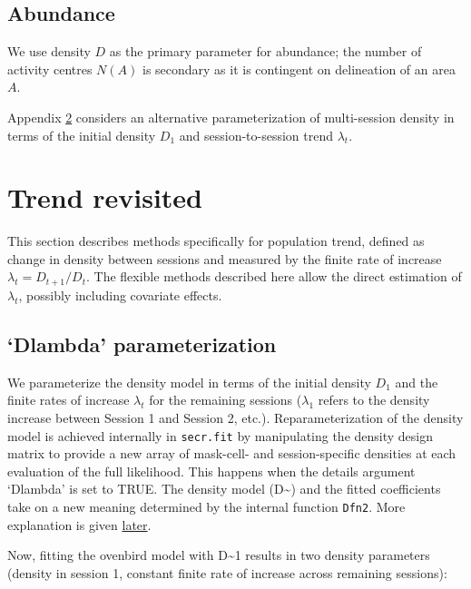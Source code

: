 \documentclass[
]{book}
\begin{document}
\section{Abundance}\label{abundance}

We use density \(D\) as the primary parameter for abundance; the number of activity centres \(N(A)\) is secondary as it is contingent on delineation of an area \(A\).

Appendix \ref{Trend} considers an alternative parameterization of multi-session density in terms of the initial density \(D_1\) and session-to-session trend \(\lambda_t\).

\chapter{Trend revisited}\label{Trend}

This section describes methods specifically for population trend, defined as change in density between sessions and measured by the finite rate of increase \(\lambda_t = D_{t+1} / D_t\). The flexible methods described here allow the direct estimation of \(\lambda_t\), possibly including covariate effects.

\section{`Dlambda' parameterization}\label{dlambda-parameterization}


We parameterize the density model in terms of the initial density \(D_1\) and the finite rates of increase \(\lambda_t\) for the remaining sessions (\(\lambda_1\) refers to the density increase between Session 1 and Session 2, etc.). Reparameterization of the density model is achieved internally in \texttt{secr.fit} by manipulating the density design matrix to provide a new array of mask-cell- and session-specific densities at each evaluation of the full likelihood. This happens when the details argument `Dlambda' is set to TRUE. The density model (D\textasciitilde) and the fitted coefficients take on a new meaning determined by the internal function \texttt{Dfn2}. More explanation is given \hyperref[Review]{later}.

Now, fitting the ovenbird model with D\textasciitilde1 results in two density parameters (density in session 1, constant finite rate of increase across remaining sessions):
\end{document}
